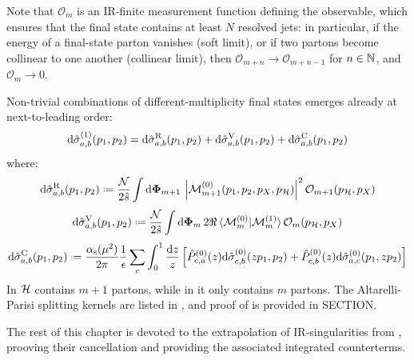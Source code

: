 Note that $ \mathcal{O}_m $ is an IR-finite measurement function defining the observable, which ensures that the final state contains at least $ N $ resolved jets: in particular, if the energy of a final-state parton vanishes (soft limit), or if two partons become collinear to one another (collinear limit), then $ \mathcal{O}_{m + n} \rightarrow \mathcal{O}_{m + n - 1} $ for $ n \in \mathbb{N} $, and $ \mathcal{O}_m \rightarrow 0 $.

Non-trivial combinations of different-multiplicity final states emerges already at next-to-leading order:
\begin{equation}
  \mathrm{d}\hat{\sigma}_{a,b}^{(1)}(p_1 , p_2) = \mathrm{d}\hat{\sigma}_{a,b}^\text{R}(p_1 , p_2) + \mathrm{d}\hat{\sigma}_{a,b}^\text{V}(p_1 , p_2) + \mathrm{d}\hat{\sigma}_{a,b}^\text{C}(p_1 , p_2)
\end{equation}
where:
\begin{equation}
  \dd\pcs_{a,b}^\text{R}(p_1 , p_2) \defeq \frac{\mathcal{N}}{2\hat{s}} \int \lps_{m+1} \, \abs{\mat^{(0)}_{m+1}(p_1, p_2, p_X, p_\fs)}^2 \mathcal{O}_{m+1}(p_\fs, p_X)
  \label{eq:real-cs}
\end{equation}
\begin{equation}
  \dd\pcs_{a,b}^\text{V}(p_1 , p_2) \defeq \frac{\mathcal{N}}{2\hat{s}} \int \lps_m \, 2\Re \braket{\mat_m^{(0)} | \mat_m^{(1)}} \mathcal{O}_m(p_\fs, p_X)
  \label{eq:virt-cs}
\end{equation}
\begin{equation}
  \dd\pcs_{a,b}^\text{C}(p_1 , p_2) \defeq \frac{\rcr}{2\pi} \frac{1}{\de} \sum_c \int_0^1 \frac{\dd z}{z} \left[ \hat{P}_{c,a}^{(0)}(z) \dd\pcs_{c,b}^{(0)}(z p_1 , p_2) + \hat{P}_{c,b}^{(0)}(z) \dd\pcs_{a,c}^{(0)}(p_1 , z p_2) \right]
  \label{eq:pdf-cs}
\end{equation}
In  $ \mathcal{H} $ contains $ m+1 $ partons, while in  it only contains $ m $ partons. The Altarelli-Parisi splitting kernels are listed in , and proof of  is provided in SECTION.

The rest of this chapter is devoted to the extrapolation of IR-singularities from , prooving their cancellation and providing the associated integrated counterterms.










